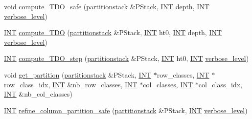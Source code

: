\begin{DoxyCompactItemize}
\item 
void \mbox{\hyperlink{classincidence__structure_ab1409e71c4b6855e49edfd3526644202}{compute\+\_\+\+T\+D\+O\+\_\+safe}} (\mbox{\hyperlink{classpartitionstack}{partitionstack}} \&P\+Stack, \mbox{\hyperlink{galois_8h_a09fddde158a3a20bd2dcadb609de11dc}{I\+NT}} depth, \mbox{\hyperlink{galois_8h_a09fddde158a3a20bd2dcadb609de11dc}{I\+NT}} \mbox{\hyperlink{simeon_8_c_a818073fbcc2f439e7c56952f67386122}{verbose\+\_\+level}})
\item 
\mbox{\hyperlink{galois_8h_a09fddde158a3a20bd2dcadb609de11dc}{I\+NT}} \mbox{\hyperlink{classincidence__structure_a617e41f176be4a8d522036666342f65e}{compute\+\_\+\+T\+DO}} (\mbox{\hyperlink{classpartitionstack}{partitionstack}} \&P\+Stack, \mbox{\hyperlink{galois_8h_a09fddde158a3a20bd2dcadb609de11dc}{I\+NT}} ht0, \mbox{\hyperlink{galois_8h_a09fddde158a3a20bd2dcadb609de11dc}{I\+NT}} depth, \mbox{\hyperlink{galois_8h_a09fddde158a3a20bd2dcadb609de11dc}{I\+NT}} \mbox{\hyperlink{simeon_8_c_a818073fbcc2f439e7c56952f67386122}{verbose\+\_\+level}})
\item 
\mbox{\hyperlink{galois_8h_a09fddde158a3a20bd2dcadb609de11dc}{I\+NT}} \mbox{\hyperlink{classincidence__structure_a6175accaa64033df34d722c594a8b827}{compute\+\_\+\+T\+D\+O\+\_\+step}} (\mbox{\hyperlink{classpartitionstack}{partitionstack}} \&P\+Stack, \mbox{\hyperlink{galois_8h_a09fddde158a3a20bd2dcadb609de11dc}{I\+NT}} ht0, \mbox{\hyperlink{galois_8h_a09fddde158a3a20bd2dcadb609de11dc}{I\+NT}} \mbox{\hyperlink{simeon_8_c_a818073fbcc2f439e7c56952f67386122}{verbose\+\_\+level}})
\item 
void \mbox{\hyperlink{classincidence__structure_a15f287785f85f3c6098dae8ec80a0ccd}{get\+\_\+partition}} (\mbox{\hyperlink{classpartitionstack}{partitionstack}} \&P\+Stack, \mbox{\hyperlink{galois_8h_a09fddde158a3a20bd2dcadb609de11dc}{I\+NT}} $\ast$row\+\_\+classes, \mbox{\hyperlink{galois_8h_a09fddde158a3a20bd2dcadb609de11dc}{I\+NT}} $\ast$row\+\_\+class\+\_\+idx, \mbox{\hyperlink{galois_8h_a09fddde158a3a20bd2dcadb609de11dc}{I\+NT}} \&nb\+\_\+row\+\_\+classes, \mbox{\hyperlink{galois_8h_a09fddde158a3a20bd2dcadb609de11dc}{I\+NT}} $\ast$col\+\_\+classes, \mbox{\hyperlink{galois_8h_a09fddde158a3a20bd2dcadb609de11dc}{I\+NT}} $\ast$col\+\_\+class\+\_\+idx, \mbox{\hyperlink{galois_8h_a09fddde158a3a20bd2dcadb609de11dc}{I\+NT}} \&nb\+\_\+col\+\_\+classes)
\item 
\mbox{\hyperlink{galois_8h_a09fddde158a3a20bd2dcadb609de11dc}{I\+NT}} \mbox{\hyperlink{classincidence__structure_a958f8ddce2d53753adb1df588bf0e721}{refine\+\_\+column\+\_\+partition\+\_\+safe}} (\mbox{\hyperlink{classpartitionstack}{partitionstack}} \&P\+Stack, \mbox{\hyperlink{galois_8h_a09fddde158a3a20bd2dcadb609de11dc}{I\+NT}} \mbox{\hyperlink{simeon_8_c_a818073fbcc2f439e7c56952f67386122}{verbose\+\_\+level}})

\end{DoxyCompactItemize}
